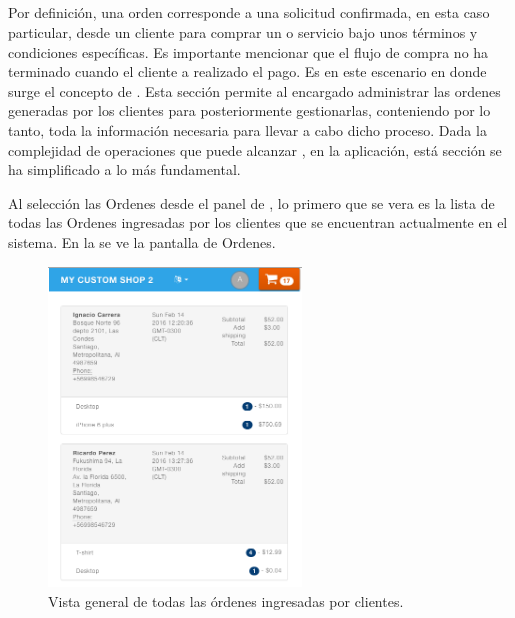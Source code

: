 \subsection{\ordersEF}

	Por definición, una orden corresponde a una solicitud confirmada, en esta caso particular, desde un cliente para comprar un \itemCOM o servicio bajo unos términos y condiciones específicas. Es importante mencionar que el flujo de compra no ha terminado cuando el cliente a realizado el pago. Es en este escenario en donde surge el concepto de \orderFulfillmentCOM.
	Esta sección permite al encargado administrar las ordenes generadas por los clientes para posteriormente gestionarlas, conteniendo por lo tanto, toda la información necesaria para llevar a cabo dicho proceso.
	Dada la complejidad de operaciones que puede alcanzar \orderFulfillmentCOM, en la aplicación, está sección se ha simplificado a lo más fundamental.

	Al selección las Ordenes desde el panel de \dashboardEF, lo primero que se vera es la lista de todas las Ordenes ingresadas por los clientes que se encuentran actualmente en el sistema. En la  se ve la pantalla de Ordenes.


	\begin{figure}[h!]
		\centering
		\includegraphics[width=0.6\textwidth]{figuras/orders/grid/main.png}
		\caption{Vista general de todas las órdenes ingresadas por clientes.}
		\label{figure:dashboard:orders:grid}
	\end{figure}

